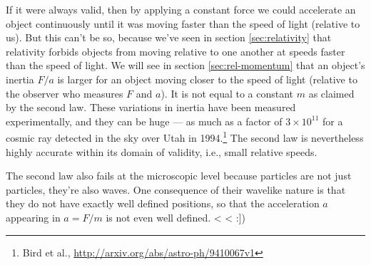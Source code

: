 \begin{listing}{1}
\begin{listing}{1}
\begin{listing}{1}
If it were always valid, then by applying a constant force we could accelerate
an object continuously until it was moving faster than the speed of light (relative to us). But this can't be so, because
we've seen in section \ref{sec:relativity} that relativity forbids objects from moving relative to one another at speeds
faster than the speed of light. We will see in section \ref{sec:rel-momentum} that an object's inertia 
$F/a$ is larger for an object moving closer to the speed of light (relative to the observer who measures $F$ and $a$).
It is not equal to a constant $m$ as claimed by the second law. These variations in inertia have been measured experimentally, and
they can be huge --- as much as a factor of $3\times 10^{11}$ for a cosmic ray detected in the sky 
over Utah in 1994.\footnote{Bird et al., \url{http://arxiv.org/abs/astro-ph/9410067v1}}
The second law is nevertheless highly accurate within
its domain of validity, i.e., small relative speeds.

The second law also fails at the microscopic level because particles are not just particles, they're also waves.
One consequence of their wavelike nature is that they do not have exactly well defined positions, so that the acceleration $a$
appearing in $a=F/m$ is not even well defined.
<%
<%
:])

\begin{summary}

\begin{vocab}



\end{vocab}

\begin{notation}


\end{notation}

\begin{othernotation}



\end{othernotation}
\end{summary}
\end{listing}
\end{listing}
\end{listing}
